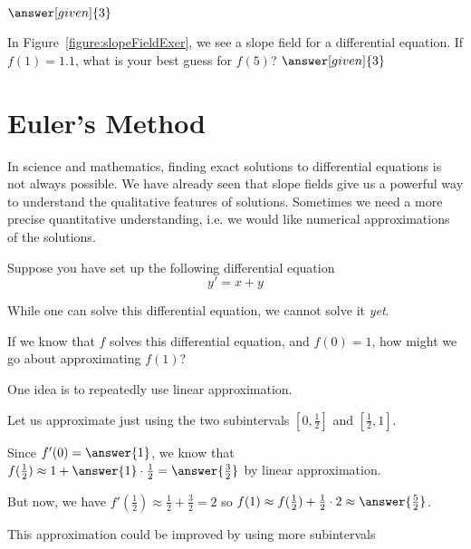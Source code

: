 \documentclass{ximera}
\begin{document}
$\answer[given]{3}$

In Figure~\ref{figure:slopeFieldExer}, we see a slope field for a
differential equation. If $f(1)=1.1$, what is your best guess for
$f(5)$?
$\answer[given]{3}$


{\def\length{sqrt(1+(-y^2+4*y-3)^2)}
}




















\section{Euler's Method}

In science and mathematics, finding exact solutions to differential equations is not always possible.
We have already seen that slope fields give us a powerful way to understand the qualitative features of solutions.
Sometimes we need a more precise quantitative understanding, i.e. we would like numerical approximations of the solutions.

\begin{example}
Suppose you have set up the following differential equation
\[
y' = x+y
\]

While one can solve this differential equation, we cannot solve it
\textit{yet}. 

If we know that $f$ solves this differential equation, and $f(0) = 1$, how might we go about approximating $f(1)$?

One idea is to repeatedly use linear approximation.

Let us approximate just using the two subintervals $[0,\frac{1}{2}]$ and $[\frac{1}{2},1]$.

Since $f'(0) = \answer{1}$, we know that $f(\frac{1}{2}) \approx 1+\answer{1} \cdot \frac{1}{2} = \answer{\frac{3}{2}}$ by linear approximation.

But now, we have $f'(\frac{1}{2}) \approx \frac{1}{2}+\frac{3}{2} = 2$ so $f(1) \approx  f(\frac{1}{2})+\frac{1}{2} \cdot 2 \approx \answer{\frac{5}{2}}$.

This approximation could be improved by using more subintervals
\end{example}
\end{document}

